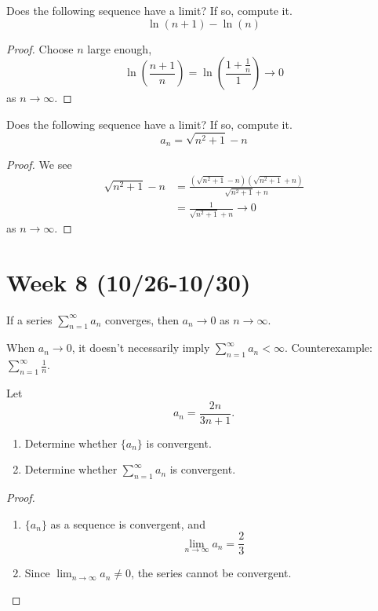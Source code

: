\documentclass[openany]{book}
\begin{document}
\begin{prob}
    Does the following sequence have a limit? If so, compute it.
    \begin{equation*}
        \ln(n+1)-\ln (n)
    \end{equation*}
\end{prob}
\begin{proof}
    Choose $n$ large enough,
    \begin{equation*}
        \ln\left(\frac{n+1}{n}\right)=\ln\left(\frac{1+\frac{1}{n}}{1}\right)\to 0
    \end{equation*}
    as $n\to\infty$.
\end{proof}


\begin{prob}
    Does the following sequence have a limit? If so, compute it.
    \begin{equation*}
        a_n=\sqrt{n^2+1}-n
    \end{equation*}
\end{prob}
\begin{proof}
    We see 
    \begin{align*}
        \sqrt{n^2+1}-n&=\frac{(\sqrt{n^2+1}-n)(\sqrt{n^2+1}+n)}{\sqrt{n^2+1}+n}\\
        &=\frac{1}{\sqrt{n^2+1}+n}\to 0
    \end{align*}
    as $n\to\infty$.
\end{proof}


\newpage
\section*{\centering Week 8 (10/26-10/30)}

\begin{prop}
    If a series $\sum_{n=1}^\infty a_n$ converges, then $a_n\to 0$ as $n\to\infty$.
\end{prop}
\begin{warn}
    When $a_n\to 0$, it doesn't necessarily imply $\sum_{n=1}^\infty a_n<\infty$. Counterexample: $\sum_{n=1}^\infty\frac{1}{n}$.
\end{warn}


\begin{prob}
    Let
    \[
    a_n = \frac{2n}{3n+1}.
    \]
    \begin{enumerate}
        \item[(a)] Determine whether $\{a_n\}$ is convergent.
        \item[(b)] Determine whether $\displaystyle\sum_{n=1}^{\infty} a_n$ is convergent.
    \end{enumerate}
\end{prob}
\begin{proof}
    \begin{enumerate}
        \item $\{a_n\}$ as a sequence is convergent, and 
        \begin{equation*}
            \lim_{n\to\infty}a_n=\frac{2}{3}
        \end{equation*}
        \item Since $\lim_{n\to\infty}a_n\neq 0$, the series cannot be convergent.
    \end{enumerate}
\end{proof}
\end{document}
